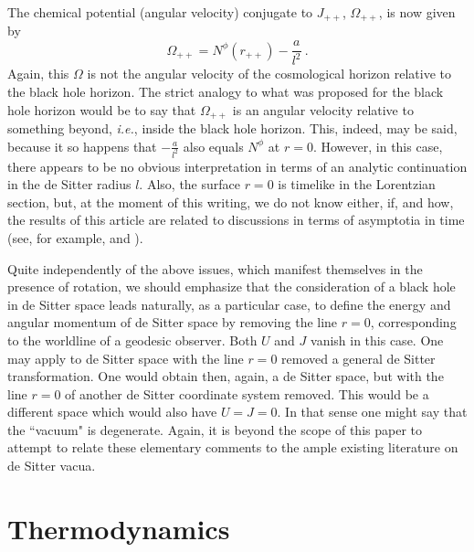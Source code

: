 \documentclass[a4paper,preprintnumbers,amsmath,amssymb]{revtex4}
\begin{document}
The chemical potential (angular velocity) conjugate to $J_{++}$, $\Omega_{++}$,
is now given by
\begin{equation}
\Omega_{++} = N^{\phi}(r_{++}) - \frac{a}{l^2} \ .
\label{omega++}
\end{equation}
Again, this $\Omega$ is not the angular velocity of the cosmological horizon
relative to the black hole horizon. The strict analogy to what was proposed
for the black hole horizon would be to say that $\Omega_{++}$ is an angular velocity
relative to something beyond, {\it i.e.}, inside the black hole horizon. This, indeed, may be said,
because it so happens that $- \frac{a}{l^2}$ also equals $N^{\phi}$ at $r=0$.
However, in this case, there appears to be no obvious interpretation in terms of an analytic continuation in the de Sitter radius $l$.
Also, the surface $r=0$ is timelike in the Lorentzian section, but, at the moment of this writing, we
do not know either, if, and how, the results of this article are related to discussions
in terms of asymptotia in time (see, for example, \cite{Witten} and \cite{Strominger}).

Quite independently of the above issues, which manifest themselves in the presence
of rotation, we should emphasize that the consideration of a black hole in de Sitter
space leads naturally, as a particular case, to define the energy and angular momentum
of de Sitter space by removing the line $r=0$, corresponding to the worldline of a geodesic observer.
Both $U$ and $J$ vanish in this case. One may apply to de Sitter space with the line
$r=0$ removed a general de Sitter transformation. One would obtain then, again,
a de Sitter space, but with the line $r=0$ of another de Sitter coordinate system removed.
This would be a different space which would also have $U=J=0$. In that sense
one might say that the ``vacuum" is degenerate. Again,  it is beyond the scope of this paper to
attempt to relate these elementary comments to the ample existing literature on de Sitter
vacua\cite{bd}.

\section{Thermodynamics}
\end{document}
